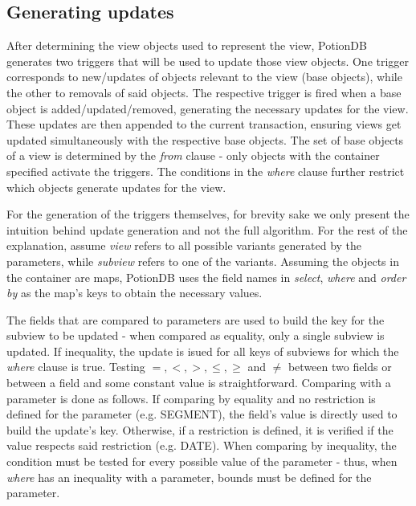 \documentclass[sigplan,10pt]{acmart}
\begin{document}
 \subsection{Generating updates}
 \label{subsec:generated_updates}
 
After determining the view objects used to represent the view, PotionDB generates two triggers that will be used to update those view objects.
One trigger corresponds to new/updates of objects relevant to the view (base objects), while the other to removals of said objects.	%
The respective trigger is fired when a base object is added/updated/removed, generating the necessary updates for the view.
These updates are then appended to the current transaction, ensuring views get updated simultaneously with the respective base objects.
The set of base objects of a view is determined by the \emph{from} clause - only objects with the container specified activate the triggers.
The conditions in the \emph{where} clause further restrict which objects generate updates for the view.

For the generation of the triggers themselves, for brevity sake we only present the intuition behind update generation and not the full algorithm.
For the rest of the explanation, assume \emph{view} refers to all possible variants generated by the parameters, while \emph{subview} refers to one of the variants.
Assuming the objects in the container are maps, PotionDB uses the field names in \emph{select}, \emph{where} and \emph{order by} as the map's keys to obtain the necessary values.

The fields that are compared to parameters are used to build the key for the subview to be updated - when compared as equality, only a single subview is updated. If inequality, the update is isued for all keys of subviews for which the \emph{where} clause is true. %
Testing $=, <, >, \leq, \geq$ and $\neq$ between two fields or between a field and some constant value is straightforward. 
Comparing with a parameter is done as follows.
If comparing by equality and no restriction is defined for the parameter (e.g. SEGMENT), the field's value is directly used to build the update's key.
Otherwise, if a restriction is defined, it is verified if the value respects said restriction (e.g. DATE).
When comparing by inequality, the condition must be tested for every possible value of the parameter - thus, when \emph{where} has an inequality with a parameter, bounds must be defined for the parameter.
\end{document}
